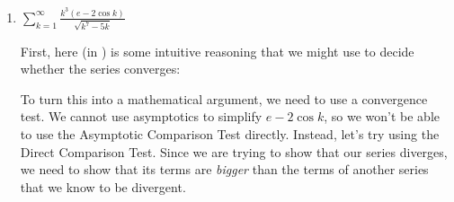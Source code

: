 \documentclass[main]{subfiles}
\begin{document}
\begin{enumerate}[resume]
\begin{enumerate}
  \begin{solution}
  $\displaystyle \frac{k^4 + 2^k - 7 \ln k}{(3^k - 10 k^2) k!} \sim
  \frac{2^k}{3^k \cdot k!} = \frac{(2 / 3)^k}{k!}$.  Since
  $\displaystyle \frac{(2 / 3)^k}{k!} > 0$, we can apply the
  Asymptotic Comparison Test to conclude that $\displaystyle \sum
  \frac{k^4 + 2^k}{(3^k - 10 k^2) k!}$ behaves the same way (in terms
  of convergence) as $\displaystyle \sum \frac{(2 / 3)^k}{k!}$.

  Now, we need to figure out whether $\displaystyle \sum \frac{(2 /
  3)^k}{k!}$ converges.  We can use the Direct Comparison Test:
  $\displaystyle 0 < \frac{(2 / 3)^k}{k!} \leq \left( \frac{2}{3}
  \right)^k$, and we know that $\displaystyle \sum \left( \frac{2}{3}
  \right)^k$ converges because it's a geometric series with common
  ratio $\displaystyle \frac{2}{3}$, and $\displaystyle \left|
  \frac{2}{3} \right| < 1$.  Therefore, the Comparison Test says
  that $\displaystyle \sum \frac{(2 / 3)^k}{k!}$ converges, so
  $\displaystyle \sum \frac{k^4 + 2^k - 7 \ln k}{(3^k - 10 k^2) k!}
  \sim \frac{2^k}{3^k \cdot k!}$ converges, too.
  \end{solution}
  
  
  \item
  \begin{problem}[1in]
  $\displaystyle \sum_{k=1}^{\infty} \frac{k^3 (e - 2 \cos
  k)}{\sqrt{k^7- 5 k}}$
  \end{problem}

  \begin{solution}
  First, here (in \ideacolor) is some intuitive reasoning that we
  might use to decide whether the series converges: 

  To turn this into a mathematical argument, we need to use a
  convergence test.  We cannot use asymptotics to simplify $e - 2 \cos
  k$, so we won't be able to use the Asymptotic Comparison Test
  directly.  Instead, let's try using the Direct Comparison Test.
  Since we are trying to show that our series diverges, we need to
  show that its terms are \textit{bigger} than the terms of another
  series that we know to be divergent.  


\end{solution}
\end{enumerate}
\end{enumerate}
\end{document}
